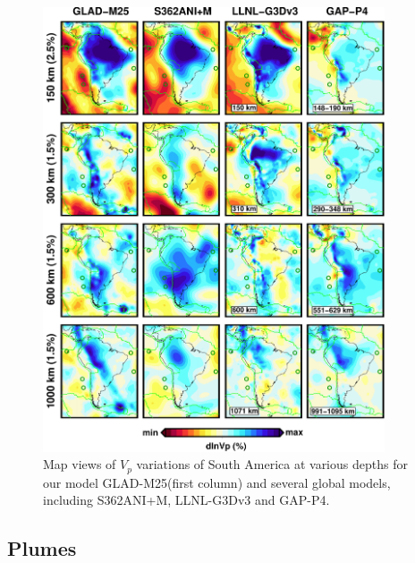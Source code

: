 \documentclass[extra,mreferee]{gji}
\begin{document}
\begin{figure}
\includegraphics[width=0.9\textwidth]{figures/depth_slice/south_america_vp.pdf}
  \caption{Map views of $V_p$ variations of South America at various depths for our model GLAD-M25(first column) and several global models, including S362ANI+M, LLNL-G3Dv3 and GAP-P4\citep{fukao2013subducted}.}
\label{fig:southamerica-vp}
\centering
\end{figure}

\subsection{Plumes}

\end{document}
